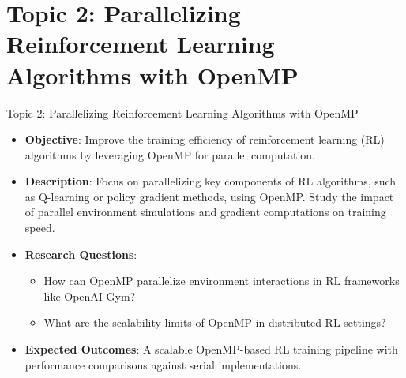 \documentclass[compress]{beamer}
\begin{document}
\section{Topic 2: Parallelizing Reinforcement Learning Algorithms with OpenMP}
\begin{frame}{Topic 2: Parallelizing Reinforcement Learning Algorithms with OpenMP}
    \begin{itemize}
        \item \textbf{Objective}: Improve the training efficiency of reinforcement learning (RL) algorithms by leveraging OpenMP for parallel computation.
        \item \textbf{Description}: Focus on parallelizing key components of RL algorithms, such as Q-learning or policy gradient methods, using OpenMP. Study the impact of parallel environment simulations and gradient computations on training speed.
        \item \textbf{Research Questions}:
        \begin{itemize}
            \item How can OpenMP parallelize environment interactions in RL frameworks like OpenAI Gym?
            \item What are the scalability limits of OpenMP in distributed RL settings?
        \end{itemize}
        \item \textbf{Expected Outcomes}: A scalable OpenMP-based RL training pipeline with performance comparisons against serial implementations.
    \end{itemize}
\end{frame}

\end{document}
